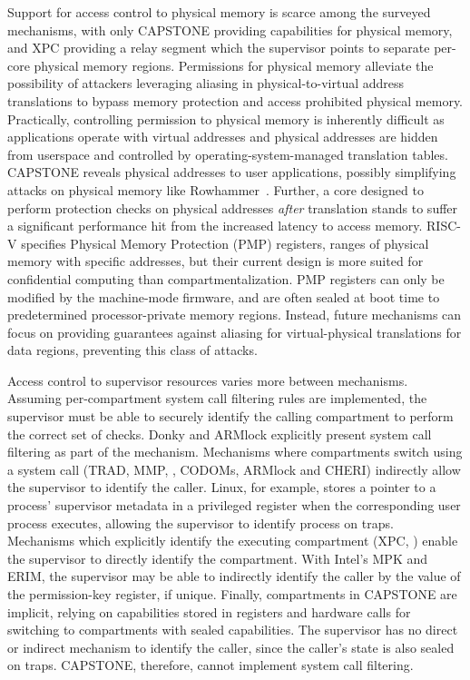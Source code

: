 Support for access control to physical memory is scarce among the surveyed
mechanisms, with only CAPSTONE providing capabilities for physical memory, and
XPC providing a relay segment which the supervisor points to separate per-core
physical memory regions.
Permissions for physical memory alleviate the possibility of attackers leveraging
aliasing in physical-to-virtual address translations to bypass memory protection
and access prohibited physical memory.
Practically, controlling permission to physical memory is inherently difficult
as applications operate with virtual addresses and physical addresses are hidden
from userspace and controlled by operating-system-managed translation tables.
CAPSTONE reveals physical addresses to user applications, possibly simplifying 
attacks on physical memory like Rowhammer~\cite{mutlu2019rowhammer}.
Further, a core designed to perform protection checks on physical addresses 
\emph{after} translation stands to suffer a significant performance hit from
the increased latency to access memory.
RISC-V specifies Physical Memory Protection (PMP) registers, ranges of physical 
memory with specific addresses, but their current design is more suited for
confidential computing than compartmentalization.
PMP registers can only be modified by the machine-mode firmware, and are often
sealed at boot time to predetermined processor-private memory regions.
Instead, future mechanisms can focus on providing guarantees against aliasing
for virtual-physical translations for data regions, preventing this class of
attacks.

Access control to supervisor resources varies more between mechanisms.
Assuming per-compartment system call filtering rules are implemented, the 
supervisor must be able to securely identify the calling compartment to
perform the correct set of checks.
Donky and ARMlock explicitly present system call filtering as part of the 
mechanism.
Mechanisms where compartments switch using a 
system call (TRAD, MMP, \lwc, CODOMs, ARMlock and CHERI) 
indirectly allow the supervisor to identify the caller. 
Linux, for example, stores a pointer to a process' supervisor metadata in a
privileged register when the corresponding user process executes, allowing
the supervisor to identify process on traps.
Mechanisms which explicitly identify the executing compartment (XPC, \seccells)
enable the supervisor to directly identify the compartment.
With Intel's MPK and ERIM, the supervisor may be able to indirectly identify the 
caller by the value of the permission-key register, if unique.
Finally, compartments in CAPSTONE are implicit, relying on capabilities
stored in registers and hardware calls for switching to compartments with
sealed capabilities.
The supervisor has no direct or indirect mechanism to identify the caller, since
the caller's state is also sealed on traps.
CAPSTONE, therefore, cannot implement system call filtering.

